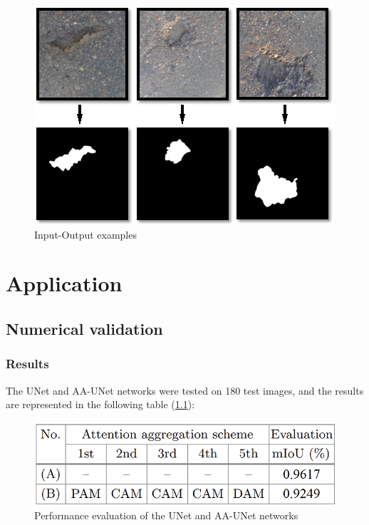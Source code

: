 \documentclass[runningheads,a4paper,11pt]{report}
\begin{document}
\begin{figure}[htbp]
    \centerline{\includegraphics{assets/uNetExamples.png}}  
    \caption{Input-Output examples}
    \label{uNetExamples}
\end{figure}


\newpage
\chapter{Application}
\label{chapter:application}

\section{Numerical validation}
\label{section:numericalValidation}

\subsection{Results}
\label{section:results}

The UNet and AA-UNet networks were tested on 180 test images, and the results are represented in the following table (\ref{uNetEval}):

\begin{figure}[htbp]
    \centerline{\includegraphics{assets/uNetEval.png}}  
    \caption{Performance evaluation of the UNet and AA-UNet networks}
    \label{uNetEval}
\end{figure}




\end{document}
